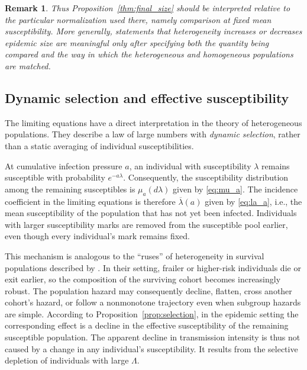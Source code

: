 \documentclass[pdflatex,sn-mathphys-ay]{sn-jnl}
\theoremstyle{thmstyleone}
\theoremstyle{thmstyletwo}
\theoremstyle{thmstylethree}
\newtheorem{remark}[theorem]{Remark}
\begin{document}
\begin{remark}
Thus Proposition~\ref{thm:final_size} should be interpreted relative to the particular normalization used there, namely comparison at fixed mean susceptibility. More generally, statements that heterogeneity increases or decreases epidemic size are meaningful only after specifying both the quantity being compared and the way in which the heterogeneous and homogeneous populations are matched.
\end{remark}


\subsection{Dynamic selection and effective susceptibility}

The limiting equations have a direct interpretation in the theory of
heterogeneous populations. They describe a law of large numbers with
\emph{dynamic selection}, rather than a static averaging of individual
susceptibilities.

At cumulative infection pressure \(a\), an individual with susceptibility
\(\lambda\) remains susceptible with probability \(e^{-a\lambda}\).
Consequently, the susceptibility distribution among the remaining
susceptibles is
\(
\mu_a(d\lambda) \) given by \eqref{eq:mu_a}. 
The incidence coefficient in the limiting equations is therefore
\(
\overline{\lambda}(a)
\) given by \eqref{eq:la_a}, i.e., 
the mean susceptibility of the population that has not yet been infected.
Individuals with larger susceptibility marks are removed from the susceptible
pool earlier, even though every individual's mark remains fixed.

This mechanism is analogous to the ``ruses'' of heterogeneity 
 in survival populations described by \cite{VaupelYashin1985}. In their
setting, frailer or higher-risk individuals die or exit earlier, so the
composition of the surviving cohort becomes increasingly robust. The
population hazard may consequently decline, flatten, cross another cohort's
hazard, or follow a nonmonotone trajectory even when subgroup hazards are
simple.   According to Proposition~\ref{prop:selection}, in the epidemic setting the corresponding effect is a decline in the
effective susceptibility of the remaining susceptible population. 
The apparent decline in transmission intensity is thus not caused by a change
in any individual's susceptibility. It results from the selective depletion
of individuals with large \(\Lambda\).
\end{document}
